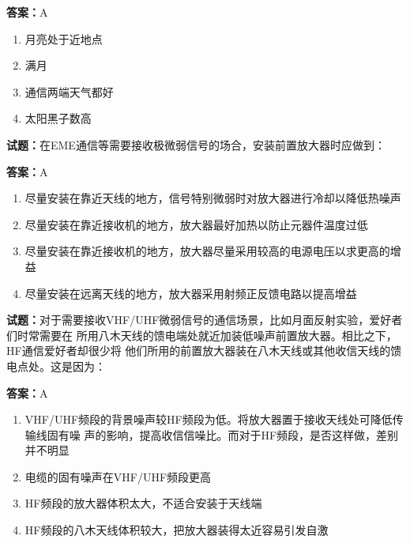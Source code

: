 \documentclass{ctexbook}
\begin{document}
\textbf{答案：}A 

\begin{enumerate}[leftmargin=3em]
  \item 月亮处于近地点 

  \item 满月 

  \item 通信两端天气都好 

  \item 太阳黑子数高 

\end{enumerate}





\vspace{1em}

\textbf{试题：}在EME通信等需要接收极微弱信号的场合，安装前置放大器时应做到： 

\textbf{答案：}A 

\begin{enumerate}[leftmargin=3em]
  \item 尽量安装在靠近天线的地方，信号特别微弱时对放大器进行冷却以降低热噪声 

  \item 尽量安装在靠近接收机的地方，放大器最好加热以防止元器件温度过低 

  \item 尽量安装在靠近接收机的地方，放大器尽量采用较高的电源电压以求更高的增益 

  \item 尽量安装在远离天线的地方，放大器采用射频正反馈电路以提高增益 

\end{enumerate}





\vspace{1em}

\textbf{试题：}对于需要接收VHF/UHF微弱信号的通信场景，比如月面反射实验，爱好者们时常需要在
所用八木天线的馈电端处就近加装低噪声前置放大器。相比之下，HF通信爱好者却很少将
他们所用的前置放大器装在八木天线或其他收信天线的馈电点处。这是因为： 

\textbf{答案：}A 

\begin{enumerate}[leftmargin=3em]
  \item VHF/UHF频段的背景噪声较HF频段为低。将放大器置于接收天线处可降低传输线固有噪
声的影响，提高收信信噪比。而对于HF频段，是否这样做，差别并不明显 

  \item 电缆的固有噪声在VHF/UHF频段更高 

  \item HF频段的放大器体积太大，不适合安装于天线端 

  \item HF频段的八木天线体积较大，把放大器装得太近容易引发自激 

\end{enumerate}
\end{document}
